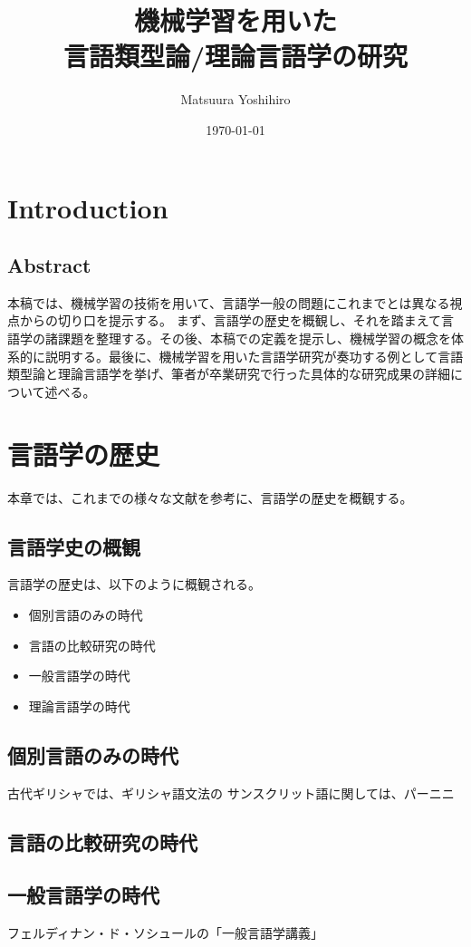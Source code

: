 \documentclass[12pt, oneside]{book} %
\title{機械学習を用いた\\言語類型論/理論言語学の研究}
\author{Matsuura Yoshihiro} %
\date{\today} %
\begin{document}
\maketitle

\tableofcontents

\mainmatter
\part{Introduction}
\chapter{Abstract}
本稿では、機械学習の技術を用いて、言語学一般の問題にこれまでとは異なる視点からの切り口を提示する。
まず、言語学の歴史を概観し、それを踏まえて言語学の諸課題を整理する。その後、本稿での定義を提示し、機械学習の概念を体系的に説明する。最後に、機械学習を用いた言語学研究が奏功する例として言語類型論と理論言語学を挙げ、筆者が卒業研究で行った具体的な研究成果の詳細について述べる。

\part{言語学の歴史}
本章では、これまでの様々な文献を参考に、言語学の歴史を概観する。
\chapter{言語学史の概観}
言語学の歴史は、以下のように概観される。
\begin{itemize}
    \item 個別言語のみの時代
    \item 言語の比較研究の時代
    \item 一般言語学の時代
    \item 理論言語学の時代
\end{itemize}
\chapter{個別言語のみの時代}
古代ギリシャでは、ギリシャ語文法の
サンスクリット語に関しては、パーニニ
\chapter{言語の比較研究の時代}
\chapter{一般言語学の時代}
フェルディナン・ド・ソシュールの「一般言語学講義」
\end{document}
